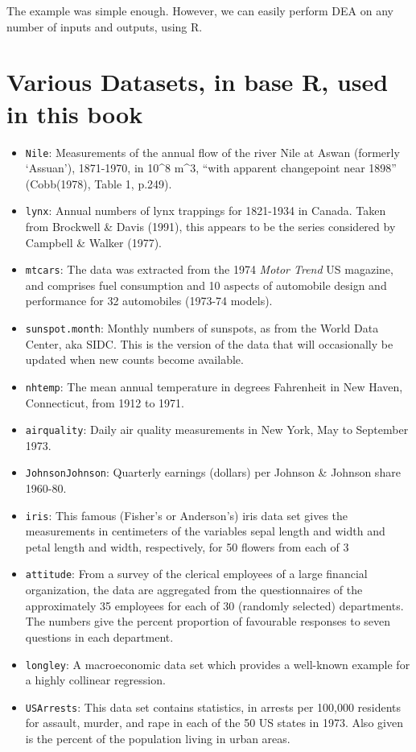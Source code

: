 \documentclass[
]{book}
\begin{document}
The example was simple enough. However, we can easily perform DEA on any number of inputs and outputs, using R.

\hypertarget{appendix-appendix}{%
\appendix}


\hypertarget{various-datasets-in-base-r-used-in-this-book}{%
\chapter{Various Datasets, in base R, used in this book}\label{various-datasets-in-base-r-used-in-this-book}}

\begin{itemize}
\item
  \texttt{Nile}:
  Measurements of the annual flow of the river Nile at Aswan (formerly
  `Assuan'), 1871-1970, in 10\^{}8 m\^{}3, ``with apparent changepoint near
  1898'' (Cobb(1978), Table 1, p.249).
\item
  \texttt{lynx}:
  Annual numbers of lynx trappings for 1821-1934 in Canada. Taken from
  Brockwell \& Davis (1991), this appears to be the series considered by
  Campbell \& Walker (1977).
\item
  \texttt{mtcars}:
  The data was extracted from the 1974 \emph{Motor Trend} US magazine, and
  comprises fuel consumption and 10 aspects of automobile design and
  performance for 32 automobiles (1973-74 models).
\item
  \texttt{sunspot.month}:
  Monthly numbers of sunspots, as from the World Data Center, aka SIDC.
  This is the version of the data that will occasionally be updated when
  new counts become available.
\item
  \texttt{nhtemp}:
  The mean annual temperature in degrees Fahrenheit in New Haven,
  Connecticut, from 1912 to 1971.
\item
  \texttt{airquality}:
  Daily air quality measurements in New York, May to September 1973.
\item
  \texttt{JohnsonJohnson}:
  Quarterly earnings (dollars) per Johnson \& Johnson share 1960-80.
\item
  \texttt{iris}:
  This famous (Fisher's or Anderson's) iris data set gives the
  measurements in centimeters of the variables sepal length and width and
  petal length and width, respectively, for 50 flowers from each of 3
\item
  \texttt{attitude}:
  From a survey of the clerical employees of a large financial
  organization, the data are aggregated from the questionnaires of the
  approximately 35 employees for each of 30 (randomly selected)
  departments. The numbers give the percent proportion of favourable
  responses to seven questions in each department.
\item
  \texttt{longley}:
  A macroeconomic data set which provides a well-known example for a
  highly collinear regression.
\item
  \texttt{USArrests}:
  This data set contains statistics, in arrests per 100,000 residents for
  assault, murder, and rape in each of the 50 US states in 1973. Also
  given is the percent of the population living in urban areas.
\end{itemize}

  
\end{document}

